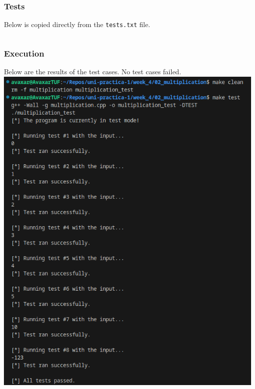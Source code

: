 \documentclass[12pt]{article}
\begin{document}
\subsubsection{Tests}
Below is copied directly from the \texttt{tests.txt} file.
\inputminted{text}{02_multiplication/tests.txt}

\subsubsection{Execution}
Below are the results of the test cases. No test cases failed.
\newline\includegraphics[width=\textwidth]{02_multiplication_test}
\end{document}
